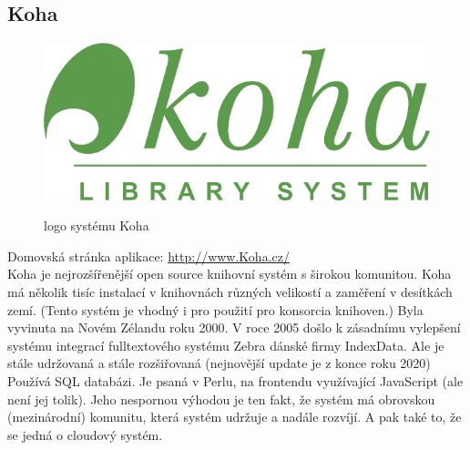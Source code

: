 \subsection{Koha}
\begin{figure}
	\includegraphics[width=\linewidth]{img/Koha_Logo.png}\\
	\caption[logo systému Koha ze stránky \url{https://www.mainelibit.org/node/77}]{logo systému Koha}
\end{figure}
Domovská stránka aplikace: \url{http://www.Koha.cz/}\\
Koha je nejrozšířenější open source knihovní systém s širokou komunitou.
Koha má několik tisíc instalací v knihovnách různých velikostí a
zaměření v desítkách zemí.
(Tento systém je vhodný i pro použití pro konsorcia knihoven.)
Byla vyvinuta na Novém Zélandu roku 2000.
V roce 2005 došlo k zásadnímu vylepšení systému integrací fulltextového
systému Zebra dánské firmy IndexData.
Ale je stále udržovaná a stále rozšiřovaná
(nejnovější update je z konce roku 2020)
\\
Používá SQL databázi.
Je psaná v Perlu, na frontendu využívající JavaScript (ale není jej tolik).
Jeho nespornou výhodou je ten fakt, že systém má obrovskou (mezinárodní)
komunitu, která systém udržuje a nadále rozvíjí.
A pak také to, že se jedná o cloudový systém.


